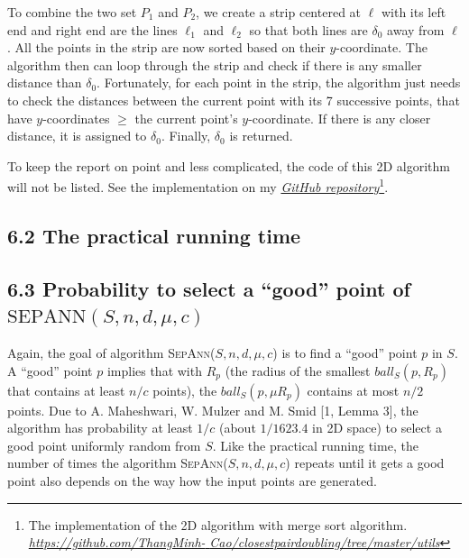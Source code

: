 \documentclass[12pt,english,]{article}
\newcommand{\pnt}[1]{{\scriptstyle#1}}
\begin{document}
To combine the two set \(P_1\) and \(P_2\), we create a strip centered
at \(\ell\) with its left end and right end are the lines \(\ell_1\) and
\(\ell_2\) so that both lines are \(\delta_0\) away from \(\ell\). All
the points in the strip are now sorted based on their \(y\)-coordinate.
The algorithm then can loop through the strip and check if there is any
smaller distance than \(\delta_0\). Fortunately, for each point in the
strip, the algorithm just needs to check the distances between the
current point with its 7 successive points, that have \(y\)-coordinates
\(\geq\) the current point's \(y\)-coordinate. If there is any closer
distance, it is assigned to \(\delta_0\). Finally, \(\delta_0\) is
returned.

To keep the report on point and less complicated, the code of this 2D
algorithm will not be listed. See the implementation on my
\href{https://github.com/ThangMinhCao/closestpairdoubling/tree/master/utils}{\emph{GitHub
repository}}\footnote{The implementation of the 2D algorithm with merge
  sort algorithm.
  \href{https://github.com/ThangMinhCao/closestpairdoubling/tree/master/utils}{\emph{https://github.com/ThangMinh-}
  \emph{Cao/closestpairdoubling/tree/master/utils}}}.

\hypertarget{the-practical-running-time}{%
\subsection{6.2 The practical running
time}\label{the-practical-running-time}}

\hypertarget{section6.2}{%
\subsection{\texorpdfstring{6.3 Probability to select a ``good'' point
of
\(\mathrm{S\pnt{EP}A\pnt{NN}}(S,n,d,\mu,c)\)}{6.3 Probability to select a ``good'' point of \textbackslash{}mathrm\{S\textbackslash{}pnt\{EP\}A\textbackslash{}pnt\{NN\}\}(S,n,d,\textbackslash{}mu,c)}}\label{section6.2}}

Again, the goal of algorithm \textsc{SepAnn($S,n,d,\mu,c$)} is to find a
``good'' point \(p\) in \(S\). A ``good'' point \(p\) implies that with
\(R_p\) (the radius of the smallest \(ball_S(p,R_p)\) that contains at
least \(n/c\) points), the \(ball_S(p,\mu R_p)\) contains at most
\(n/2\) points. Due to A. Maheshwari, W. Mulzer and M. Smid {[}1, Lemma
3{]}, the algorithm has probability at least \(1/c\) (about \(1/1623.4\)
in 2D space) to select a good point uniformly random from \(S\). Like
the practical running time, the number of times the algorithm
\textsc{SepAnn($S,n,d,\mu,c$)} repeats until it gets a good point also
depends on the way how the input points are generated.
\end{document}
